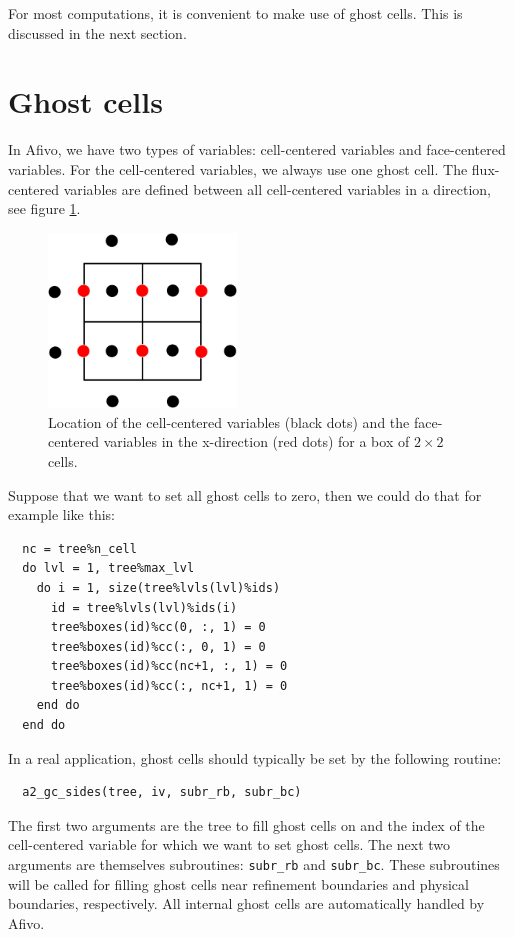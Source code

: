 \documentclass[a4paper, a4wide]{article}
\begin{document}
For most computations, it is convenient to make use of ghost cells.
This is discussed in the next section.

\section{Ghost cells}
\label{sec:ghost-cells}

In Afivo, we have two types of variables: cell-centered variables and
face-centered variables.
For the cell-centered variables, we always use one ghost cell. The flux-centered
variables are defined between all cell-centered variables in a direction, see
figure \ref{fig:location-cc-fx}.

\begin{figure}
  \centering
  \includegraphics[width=5cm]{figures/location_cc_fx.png}
  \caption{Location of the cell-centered variables (black dots) and the
    face-centered variables in the x-direction (red dots) for a box of $2\times
    2$ cells.}
  \label{fig:location-cc-fx}
\end{figure}

Suppose that we want to set all ghost cells to zero, then we could do that for
example like this:
\begin{lstlisting}
  nc = tree%n_cell
  do lvl = 1, tree%max_lvl
    do i = 1, size(tree%lvls(lvl)%ids)
      id = tree%lvls(lvl)%ids(i)
      tree%boxes(id)%cc(0, :, 1) = 0
      tree%boxes(id)%cc(:, 0, 1) = 0
      tree%boxes(id)%cc(nc+1, :, 1) = 0
      tree%boxes(id)%cc(:, nc+1, 1) = 0
    end do
  end do
\end{lstlisting}
In a real application, ghost cells should typically be set by the following routine:
\begin{lstlisting}
  a2_gc_sides(tree, iv, subr_rb, subr_bc)
\end{lstlisting}
The first two arguments are the tree to fill ghost cells on and the index of the
cell-centered variable for which we want to set ghost cells.
The next two arguments are themselves subroutines: \texttt{subr\_rb} and
\texttt{subr\_bc}.
These subroutines will be called for filling ghost cells near refinement
boundaries and physical boundaries, respectively.
All internal ghost cells are automatically handled by Afivo.
\end{document}
